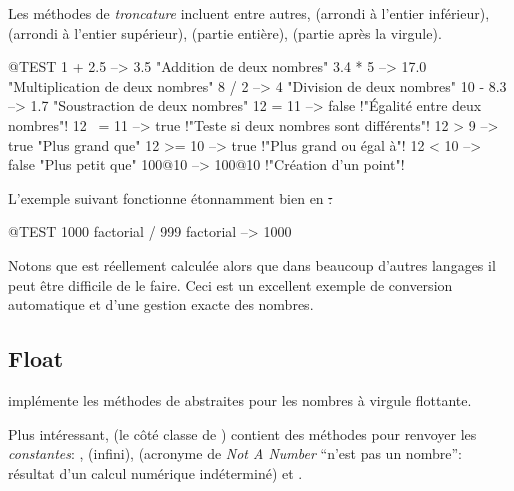 \documentclass[a4paper,10pt,twoside]{book}
\begin{document}
Les méthodes de \emph{troncature} incluent entre autres,
(arrondi à l'entier inférieur),
(arrondi à l'entier supérieur), 
(partie entière), 
(partie après la virgule).

\begin{code}{@TEST}
1 + 2.5     --> 3.5             "Addition de deux nombres"
3.4 * 5      --> 17.0           "Multiplication de deux nombres"
8 / 2         --> 4                 "Division de deux nombres"
10 - 8.3   --> 1.7              "Soustraction de deux nombres"
12 = 11    --> false           !"Égalité entre deux nombres"!
12 ~= 11 --> true            !"Teste si deux nombres sont différents"!
12 > 9      --> true            "Plus grand que"
12 >= 10  --> true            !"Plus grand ou égal à"!
12 < 10    --> false           "Plus petit que"
100@10   --> 100@10    !"Création d'un point"!
\end{code}

L'exemple suivant fonctionne étonnamment bien en \st:
\begin{code}{@TEST}
1000 factorial / 999 factorial --> 1000
\end{code}
Notons que  est réellement calculée alors que dans beaucoup d'autres langages il peut être difficile de le faire. Ceci est un excellent exemple de conversion automatique et d'une gestion exacte des nombres.


\subsection{Float}

 implémente les méthodes de  abstraites pour les nombres à virgule flottante.

Plus intéressant,  (\ie le côté classe de
) contient des méthodes pour renvoyer les
\emph{constantes}: , 
(infini), 
(acronyme de \emph{Not A Number} \cad ``n'est pas un nombre'':
résultat d'un calcul numérique indéterminé)
et .
\end{document}
